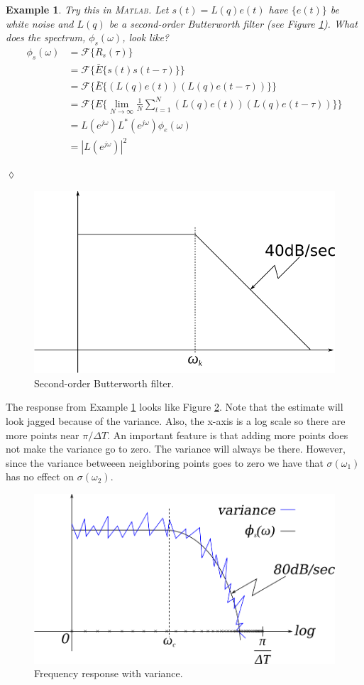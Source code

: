 \documentclass[lecture,12pt,]{pcms-l}
\theoremstyle{example}
\newtheorem{example}{Example}[section]
\newcommand{\w}{\omega}
\newcommand{\dt}{\Delta T}
\begin{document}
\begin{example}
\label{ex:sSpectrum}
Try this in \textsc{Matlab}. Let $s(t)=L(q)e(t)$ have $\{e(t)\}$ be white noise and $L(q)$ be a second-order Butterworth filter (see Figure \ref{fig:06butterworthFilter}). What does the spectrum, $\phi_s(\w)$, look like?
\begin{align*}
\phi_s(\w) &= \mathcal{F}\{R_s(\tau)\} \\
&= \mathcal{F}\{\bar{E}\{s(t)s(t-\tau)\}\} \\
&= \mathcal{F}\{\bar{E}\{(L(q)e(t))(L(q)e(t-\tau))\}\} \\
&= \mathcal{F}\{E\{\lim_{N\to\infty}\frac{1}{N}\sum_{t=1}^N(L(q)e(t))(L(q)e(t-\tau))\}\} \\
&= L(e^{j\w})L^*(e^{j\w})\phi_e(\w) \\
&= |L(e^{j\w})|^2
\end{align*}
\end{example}
$\lozenge$

\begin{figure}[ht!]
	\centering
	\includegraphics[width=.4\textwidth]{images/06butterworthFilter}
	\caption{Second-order Butterworth filter.}
	\label{fig:06butterworthFilter}
\end{figure}

The response from Example \ref{ex:sSpectrum} looks like Figure \ref{fig:06freqResp}. Note that the estimate will look jagged because of the variance. Also, the x-axis is a log scale so there are more points near $\pi/\dt$. An important feature is that adding more points does not make the variance go to zero. The variance will always be there. However, since the variance betweeen neighboring points goes to zero we have that $\sigma(\w_1)$ has no effect on $\sigma(\w_2)$.

\begin{figure}[ht!]
	\centering
	\includegraphics[width=.4\textwidth]{images/06freqResp}
	\caption{Frequency response with variance.}
	\label{fig:06freqResp}
\end{figure}
\end{document}
